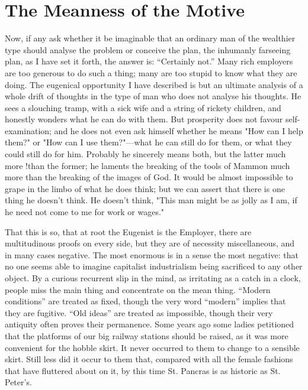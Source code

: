 \documentclass{book}
\begin{document}
\chapter{The Meanness of the Motive}
\label{chapter-15}
Now, if any ask whether it be imaginable that an ordinary man of the wealthier type should analyse the problem or conceive the plan, the inhumanly farseeing plan, as I have set it forth, the answer is: “Certainly not.” Many rich employers are too generous to do such a thing; many are too stupid to know what they are doing. The eugenical opportunity I have described is but an ultimate analysis of a whole drift of thoughts in the type of man who does not analyse his thoughts. He sees a slouching tramp, with a sick wife and a string of rickety children, and honestly wonders what he can do with them. But prosperity does not favour self-examination; and he does not even ask himself whether he means "How can I help them?" or "How can I use them?"—what he can still do for them, or what they could still do for him. Probably he sincerely means both, but the latter much more !than the former; he laments the breaking of the tools of Mammon much more than the breaking of the images of God. It would be almost impossible to grape in the limbo of what he does think; but we can assert that there is one thing he doesn’t think. He doesn’t think, "This man might be as jolly as I am, if he need not come to me for work or wages."

That this is so, that at root the Eugenist is the Employer, there are multitudinous proofs on every side, but they are of necessity miscellaneous, and in many cases negative. The most enormous is in a sense the most negative: that no one seems able to imagine capitalist industrialism being sacrificed to any other object. By a curious recurrent slip in the mind, as irritating as a catch in a clock, people miss the main thing and concentrate on the mean thing. “Modern conditions” are treated as fixed, though the very word “modern” implies that they are fugitive. “Old ideas” are treated as impossible, though their very antiquity often proves their permanence. Some years ago some ladies petitioned that the platforms of our big railway stations should be raised, as it was more convenient for the hobble skirt. It never occurred to them to change to a sensible skirt. Still less did it occur to them that, compared with all the female fashions that have fluttered about on it, by this time St. Pancras is as historic as St. Peter’s.
\end{document}
